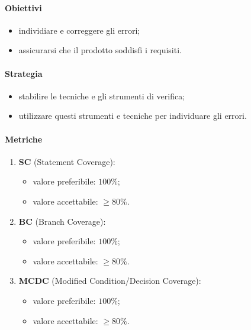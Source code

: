         \paragraph{Obiettivi}
            \begin{itemize}
                \item individiare e correggere gli errori;
                \item assicurarsi che il prodotto soddisfi i requisiti.
            \end{itemize}
        \paragraph{Strategia}
            \begin{itemize}
                \item stabilire le tecniche e gli strumenti di verifica;
                \item utilizzare questi strumenti e tecniche per individuare gli errori.
            \end{itemize}
        \paragraph{Metriche}
            \begin{enumerate}
                \item \textbf{SC} (Statement Coverage):
                \begin{itemize}
                    \item valore preferibile: $100\%$;
                    \item valore accettabile: $\geq 80\%$.
                \end{itemize}
                \item \textbf{BC} (Branch Coverage):
                \begin{itemize}
                    \item valore preferibile: $100\%$;
                    \item valore accettabile: $\geq 80\%$.
                \end{itemize}
                \item \textbf{MCDC} (Modified Condition/Decision Coverage):
                \begin{itemize}
                    \item valore preferibile: $100\%$;
                    \item valore accettabile: $\geq 80\%$.
                \end{itemize}
            \end{enumerate}
